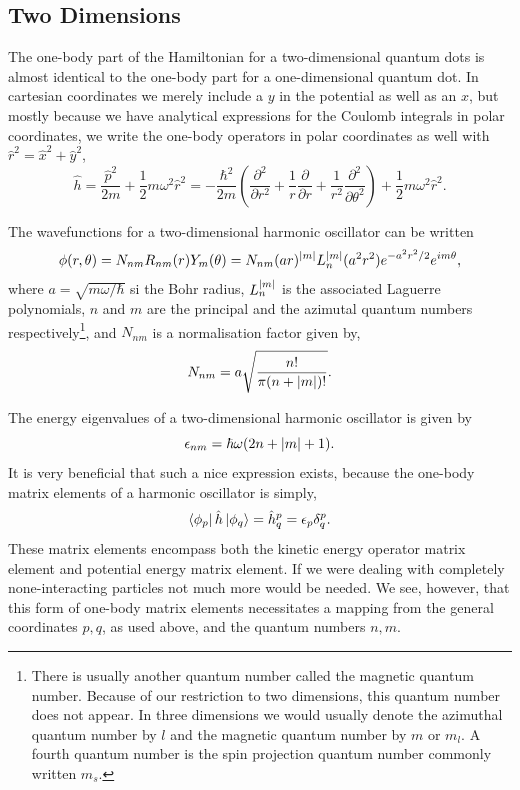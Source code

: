 \subsection{Two Dimensions}

The one-body part of the Hamiltonian for a two-dimensional quantum dots is almost
identical to the one-body part for a one-dimensional quantum dot. In cartesian
coordinates we merely include a $y$ in the potential as well as an $x$, but mostly 
because we have analytical expressions for the Coulomb integrals in polar
coordinates\cite{anisimovas1998energy}, we write the one-body operators in 
polar coordinates as well with $\hat{r}^2 = \hat{x}^2 + \hat{y}^2$,
\begin{equation}
    \label{eq:2d_ho_one_body_hamiltonian}
    \hat{h} = \frac{\hat{p}^2}{2m} + \frac{1}{2}m\omega^2\hat{r}^2
        = - \frac{\hbar^2}{2m}\left(
            \frac{\partial^2}{\partial r^2}
            + \frac{1}{r} \frac{\partial}{\partial r}
            + \frac{1}{r^2} \frac{\partial^2}{\partial \theta^2}
        \right)
        + \frac{1}{2}m\omega^2\hat{r}^2.
\end{equation}

The wavefunctions for a two-dimensional harmonic oscillator can be
written
\begin{equation}
    \label{eq:2d_ho_eigenstate}
    \phi(r,\theta) = N_{nm} R_{nm}(r) Y_m(\theta) = N_{nm} (ar)^{\abs{m}} L_n^{\abs{m}}(a^2r^2)
        e^{-a^2r^2/2} e^{im\theta},
\end{equation}
where $a=\sqrt{m\omega/\hbar}$ si the Bohr radius, $L^{\abs{m}}_n$ is 
the associated Laguerre polynomials, $n$ and $m$ are the principal and
the azimutal quantum numbers respectively\footnote{There is usually another quantum 
number called the magnetic quantum number. Because of our restriction to two dimensions,
this quantum number does not appear. In three dimensions we would usually denote the azimuthal
quantum number by $l$ and the magnetic quantum number by $m$ or $m_l$. A fourth quantum 
number is the spin projection quantum number commonly written $m_s$.}, and $N_{nm}$ is a normalisation 
factor given by,
\begin{equation}
    N_{nm} = a\sqrt{\frac{n!}{\pi(n + \abs{m})!}}.
\end{equation}


The energy eigenvalues of a two-dimensional harmonic oscillator is given by 
\begin{equation}
    \epsilon_{nm} = \hbar\omega(2n + \abs{m} + 1).
\end{equation}
It is very beneficial that such a nice expression exists, because the one-body 
matrix elements of a harmonic oscillator is simply,
\begin{equation}
    \bra{\phi_p}\hat{h}\ket{\phi_q} = \hat{h}^p_q = \epsilon_p \delta^p_q.
\end{equation}
These matrix elements encompass both the kinetic energy operator matrix element and 
potential energy matrix element. If we were dealing with completely none-interacting 
particles not much more would be needed.
We see, however, that this form of one-body matrix elements necessitates a mapping from 
the general coordinates $p,q$, as used above, and the quantum numbers $n,m$.

